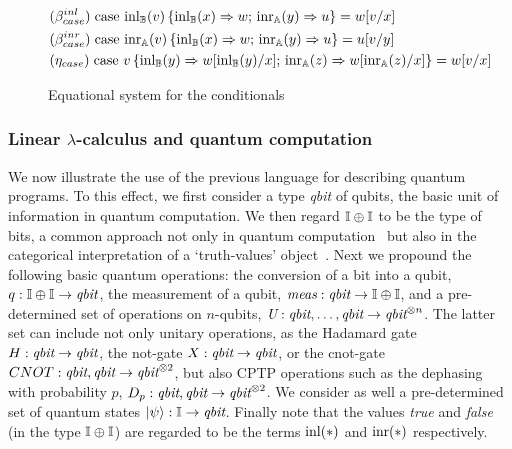\documentclass[10pt,a4paper]{amsart}
\theoremstyle{definition}
\theoremstyle{definition}
\theoremstyle{definition}
\theoremstyle{definition}
\theoremstyle{definition}
\theoremstyle{definition}
\begin{document}
  \begin{figure}[h!]
    \centering
    \begin{tcolorbox}[colframe=black, colback=white, boxrule=0.6pt, arc=1pt,boxsep=1pt,top=1pt,bottom=1pt, width=0.85 \textwidth]
    \begin{equation*}
        \begin{split}
          &(\beta_{case}^{inl}) \hspace{3pt} \text{case } 
          \mathrm{inl}_{\mathbb{B}}(v)\, \{ \mathrm{inl}_{\mathbb{B}} (x) \Rightarrow w 
          ;\, \mathrm{inr}_{\mathbb{A}} (y) 
          \Rightarrow u\}= w[v/x]
          \\
          &(\beta_{case}^{inr}) \hspace{3pt} \text{case } 
          \mathrm{inr}_{\mathbb{A}}(v)\, \{ \mathrm{inl}_{\mathbb{B}} (x) \Rightarrow w 
          ;\, \mathrm{inr}_{\mathbb{A}} (y) 
          \Rightarrow u\}= u[v/y]
          \\
          & (\eta_{case}) \hspace{3pt} \text{case } v\, \{\text{inl}_{\mathbb{B}} (y) \Rightarrow w [ \text{inl}_{\mathbb{B}}(y)/x] ;\, \text{inr}_{\mathbb{A}} (z) \Rightarrow w [ \text{inr}_{\mathbb{A}}(z)/x]\} = w[v/x] 
        \end{split}
    \end{equation*}
    \end{tcolorbox}
    \caption{Equational system for the conditionals}
    \label{fig:equations-in-context-cond}
    \end{figure}


\subsubsection{Linear $\lambda$-calculus and quantum computation} \label{subsec:syntax_qc}

We now illustrate the use of the previous language for describing quantum
programs. To this effect, we first consider a type \emph{qbit} of qubits, the
basic unit of information in quantum computation. We then regard $\mathbb{I} \oplus
\mathbb{I}$ to be the type of bits, a common approach not only in quantum
computation~\cite{selinger04} but also in the categorical interpretation of a
`truth-values' object~\cite{johnstone02,cho15}. Next we propound the following
basic quantum operations:  the conversion of a bit into a qubit, $q : \mathbb{I}
\oplus \mathbb{I}  \to \emph{qbit}$, the measurement of a qubit,
$\emph{meas}:\emph{qbit} \to \mathbb{I} \oplus \mathbb{I}$, and a pre-determined set of
operations on $n$-qubits, $\emph{U}:\emph{qbit},\ldots,\emph{qbit} \to
\emph{qbit}^{\otimes n}$. The latter set can include not only unitary operations, as the Hadamard
gate $H : \emph{qbit} \to \emph{qbit}$, the not-gate $X : \emph{qbit} \to
\emph{qbit}$, or the cnot-gate $CNOT : \emph{qbit},\emph{qbit} \to
\emph{qbit}^{\otimes 2}$, but also CPTP operations such as the dephasing with probability $p$, $D_p : \emph{qbit},\emph{qbit} \to
\emph{qbit}^{\otimes 2}$. We consider as well a pre-determined set of quantum
states $\ket{\psi} : \mathbb{I} \to \emph{qbit}$.  Finally note that the values
\emph{true} and \emph{false} (in the type $\mathbb{I} \oplus \mathbb{I}$) are regarded to be 
the terms $\mathrm{inl}(\ast)$ and $\mathrm{inr}(\ast)$ respectively.
\end{document}
